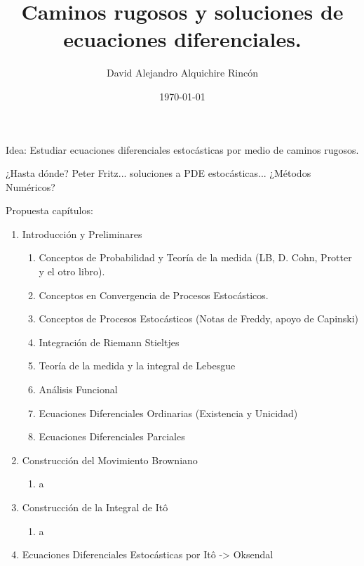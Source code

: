 \documentclass[12pt, twocolumns]{book}
\title{Caminos rugosos y soluciones de ecuaciones diferenciales.}
\author{David Alejandro Alquichire Rincón}
\date{\today}
\begin{document}
\maketitle

Idea: Estudiar ecuaciones diferenciales estocásticas por medio de caminos rugosos.

¿Hasta dónde? Peter Fritz... soluciones a PDE estocásticas... ¿Métodos Numéricos?

Propuesta capítulos:


\begin{enumerate}

\item Introducción y Preliminares

\begin{enumerate}

	\item Conceptos de Probabilidad y Teoría de la medida (LB, D. Cohn, Protter y el otro libro). 
	\item Conceptos en Convergencia de Procesos Estocásticos.
	\item Conceptos de Procesos Estocásticos (Notas de Freddy, apoyo de Capinski) 

	\item Integración de Riemann Stieltjes
	\item Teoría de la medida y la integral de Lebesgue
	\item Análisis Funcional
	\item Ecuaciones Diferenciales Ordinarias (Existencia y Unicidad)
	\item Ecuaciones Diferenciales Parciales

\end{enumerate}

\item Construcción del Movimiento Browniano

\begin{enumerate}
	\item a
\end{enumerate}


\item Construcción de la Integral de Itô

\begin{enumerate}
	\item a
\end{enumerate}


\item Ecuaciones Diferenciales Estocásticas por Itô -> Oksendal

\begin{enumerate}


\end{enumerate}
\end{enumerate}
\end{document}
